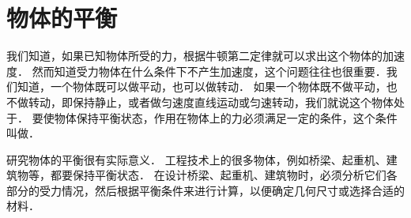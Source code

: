 \chapter{物体的平衡}\label{chapter-equilibrium-of-object}


我们知道，如果已知物体所受的力，根据牛顿第二定律就可以求出这个物体的加速度．
然而知道受力物体在什么条件下不产生加速度，这个问题往往也很重要．我们知道，一个物体既可以做平动，也可以做转动．
如果一个物体既不做平动，也不做转动，即保持静止，或者做匀速度直线运动或匀速转动，我们就说这个物体处于．
要使物体保持平衡状态，作用在物体上的力必须满足一定的条件，这个条件叫做．

研究物体的平衡很有实际意义．
工程技术上的很多物体，例如桥梁、起重机、建筑物等，都要保持平衡状态．
在设计桥梁、起重机、建筑物时，必须分析它们各部分的受力情况，然后根据平衡条件来进行计算，以便确定几何尺寸或选择合适的材料．

